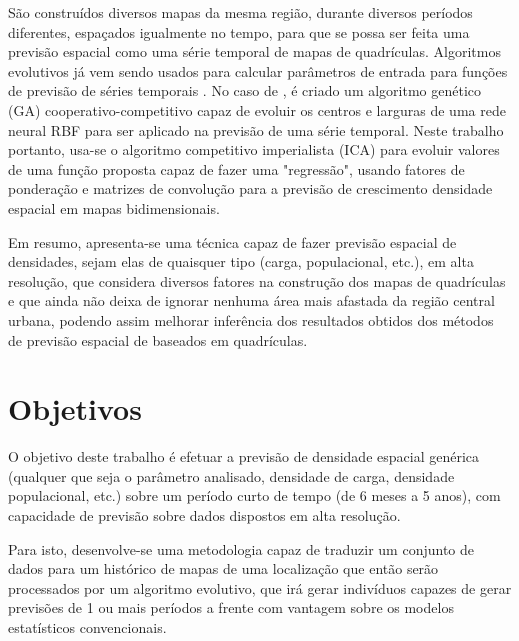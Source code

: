 São construídos diversos mapas da mesma região, durante diversos períodos diferentes, espaçados igualmente no tempo, para que se possa ser feita uma previsão espacial como uma série temporal de mapas de quadrículas. Algoritmos evolutivos já vem sendo usados para calcular parâmetros de entrada para funções de previsão de séries temporais \cite{whitehead1996cooperative}. No caso de \citeauthor{whitehead1996cooperative}, é criado um algoritmo genético (GA) \cite{mitchell1998introduction} cooperativo-competitivo capaz de evoluir os centros e larguras de uma rede neural RBF \cite{ren2006rbfnn} para ser aplicado na previsão de uma série temporal. Neste trabalho portanto, usa-se o algoritmo competitivo imperialista (ICA) para evoluir valores de uma função proposta capaz de fazer uma "regressão", usando fatores de ponderação e matrizes de convolução para a previsão de crescimento densidade espacial em mapas bidimensionais.

Em resumo, apresenta-se uma técnica capaz de fazer previsão espacial de densidades, sejam elas de quaisquer tipo (carga, populacional, etc.), em alta resolução, que considera diversos fatores na construção dos mapas de quadrículas e que ainda não deixa de ignorar nenhuma área mais afastada da região central urbana, podendo assim melhorar inferência dos resultados obtidos dos métodos de previsão espacial de baseados em quadrículas. 

\section{Objetivos}

O objetivo deste trabalho é efetuar a previsão de densidade espacial genérica (qualquer que seja o parâmetro analisado, densidade de carga, densidade populacional, etc.) sobre um período curto de tempo (de 6 meses a 5 anos), com capacidade de previsão sobre dados dispostos em alta resolução.

Para isto, desenvolve-se uma metodologia capaz de traduzir um conjunto de dados para um histórico de mapas de uma localização que então serão processados por um algoritmo evolutivo, que irá gerar indivíduos capazes de gerar previsões de 1 ou mais períodos a frente com vantagem sobre os modelos estatísticos convencionais. 

